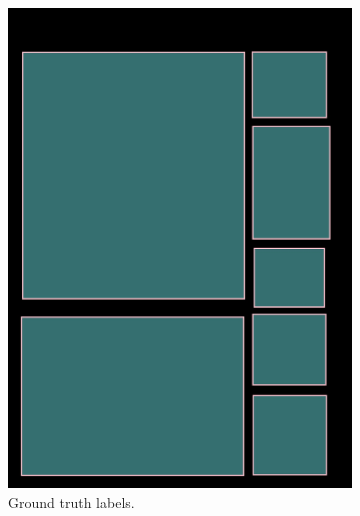\documentclass[oneside, english, bibtex]{kththesis}
\begin{document}
\begin{figure}[!htb]
\begin{adjustbox}{center,max size={\textwidth}{0.9\textheight}}
{\begin{subfigure}{0.6\textwidth}
  \includegraphics[width=\linewidth, clip=true, trim = 0mm 0mm 0mm 0mm]{figures/bbox/AVThDFz.jpg}
  \caption{Ground truth labels.}
  \label{fig:AVThDFz_GT}
\end{subfigure}
  \centering
\begin{subfigure}{0.6\textwidth}
  \centering

\end{subfigure}}
\end{adjustbox}
\end{figure}
\end{document}
